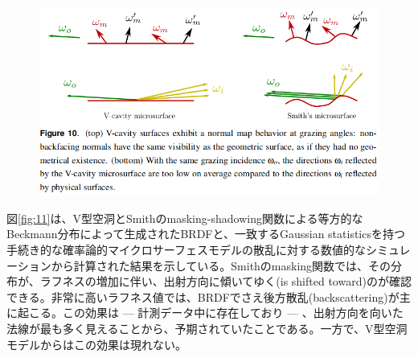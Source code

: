 \documentclass[a4j,xelatex,ja=standard]{bxjsarticle}
\begin{document}
\begin{figure}
    \includegraphics[width=\textwidth]{Figure10.png}
    \caption{}
    \label{fig:10}
\end{figure}

図\ref{fig:11}は、V型空洞とSmithのmasking-shadowing関数による等方的なBeckmann分布によって生成されたBRDFと、一致するGaussian statisticsを持つ手続き的な確率論的マイクロサーフェスモデルの散乱に対する数値的なシミュレーションから計算された結果を示している。Smithのmasking関数では、その分布が、ラフネスの増加に伴い、出射方向に傾いてゆく(is shifted toward)のが確認できる。非常に高いラフネス値では、BRDFでさえ後方散乱(backscattering)が主に起こる。この効果は --- 計測データ中に存在しており --- 、出射方向を向いた法線が最も多く見えることから、予期されていたことである。一方で、V型空洞モデルからはこの効果は現れない。
\end{document}
